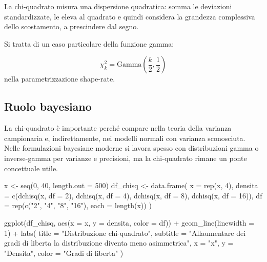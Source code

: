\documentclass[
  italian,
  letterpaper,
  a4paper,
  11pt,
  open=any]{scrbook}
\newenvironment{Shaded}{\begin{snugshade}}{\end{snugshade}}
\newcommand{\AttributeTok}[1]{\textcolor[rgb]{0.40,0.45,0.13}{#1}}
\newcommand{\DecValTok}[1]{\textcolor[rgb]{0.68,0.00,0.00}{#1}}
\newcommand{\FunctionTok}[1]{\textcolor[rgb]{0.28,0.35,0.67}{#1}}
\newcommand{\NormalTok}[1]{\textcolor[rgb]{0.00,0.23,0.31}{#1}}
\newcommand{\OtherTok}[1]{\textcolor[rgb]{0.00,0.23,0.31}{#1}}
\newcommand{\SpecialCharTok}[1]{\textcolor[rgb]{0.37,0.37,0.37}{#1}}
\newcommand{\StringTok}[1]{\textcolor[rgb]{0.13,0.47,0.30}{#1}}
\theoremstyle{plain}
\theoremstyle{definition}
\theoremstyle{definition}
\theoremstyle{remark}
\begin{document}
La chi-quadrato misura una dispersione quadratica: somma le deviazioni
standardizzate, le eleva al quadrato e quindi considera la grandezza
complessiva dello scostamento, a prescindere dal segno.

Si tratta di un caso particolare della funzione gamma:

\[
\chi^2_k = \mathrm{Gamma}\left(\frac{k}{2},\frac{1}{2}\right)
\] nella parametrizzazione shape-rate.

\subsection{Ruolo bayesiano}\label{ruolo-bayesiano-2}

La chi-quadrato è importante perché compare nella teoria della varianza
campionaria e, indirettamente, nei modelli normali con varianza
sconosciuta. Nelle formulazioni bayesiane moderne si lavora spesso con
distribuzioni gamma o inverse-gamma per varianze e precisioni, ma la
chi-quadrato rimane un ponte concettuale utile.

\begin{Shaded}
\begin{Highlighting}[]
\NormalTok{x }\OtherTok{\textless{}{-}} \FunctionTok{seq}\NormalTok{(}\DecValTok{0}\NormalTok{, }\DecValTok{40}\NormalTok{, }\AttributeTok{length.out =} \DecValTok{500}\NormalTok{)}
\NormalTok{df\_chisq }\OtherTok{\textless{}{-}} \FunctionTok{data.frame}\NormalTok{(}
  \AttributeTok{x =} \FunctionTok{rep}\NormalTok{(x, }\DecValTok{4}\NormalTok{),}
  \AttributeTok{densita =} \FunctionTok{c}\NormalTok{(}\FunctionTok{dchisq}\NormalTok{(x, }\AttributeTok{df =} \DecValTok{2}\NormalTok{), }\FunctionTok{dchisq}\NormalTok{(x, }\AttributeTok{df =} \DecValTok{4}\NormalTok{),}
              \FunctionTok{dchisq}\NormalTok{(x, }\AttributeTok{df =} \DecValTok{8}\NormalTok{), }\FunctionTok{dchisq}\NormalTok{(x, }\AttributeTok{df =} \DecValTok{16}\NormalTok{)),}
  \AttributeTok{df =} \FunctionTok{rep}\NormalTok{(}\FunctionTok{c}\NormalTok{(}\StringTok{"2"}\NormalTok{, }\StringTok{"4"}\NormalTok{, }\StringTok{"8"}\NormalTok{, }\StringTok{"16"}\NormalTok{), }\AttributeTok{each =} \FunctionTok{length}\NormalTok{(x))}
\NormalTok{)}

\FunctionTok{ggplot}\NormalTok{(df\_chisq, }\FunctionTok{aes}\NormalTok{(}\AttributeTok{x =}\NormalTok{ x, }\AttributeTok{y =}\NormalTok{ densita, }\AttributeTok{color =}\NormalTok{ df)) }\SpecialCharTok{+}
  \FunctionTok{geom\_line}\NormalTok{(}\AttributeTok{linewidth =} \DecValTok{1}\NormalTok{) }\SpecialCharTok{+}
  \FunctionTok{labs}\NormalTok{(}
    \AttributeTok{title =} \StringTok{"Distribuzione chi{-}quadrato"}\NormalTok{,}
    \AttributeTok{subtitle =} \StringTok{"All\textquotesingle{}aumentare dei gradi di liberta la distribuzione diventa meno asimmetrica"}\NormalTok{,}
    \AttributeTok{x =} \StringTok{"x"}\NormalTok{,}
    \AttributeTok{y =} \StringTok{"Densita"}\NormalTok{,}
    \AttributeTok{color =} \StringTok{"Gradi di liberta"}
\NormalTok{  )}
\end{Highlighting}
\end{Shaded}
\end{document}
